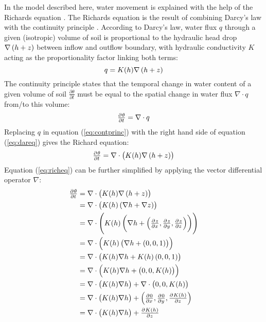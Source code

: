 In the model described here, water movement is explained with the help of the Richards equation \parencite{richards_capillary_1931}.  The Richards equation is the result of combining Darcy’s law with the continuity principle \parencite{hillel_environmental_1998}.  According to Darcy’s law, water flux $q$ through a given (isotropic) volume of soil is proportional to the hydraulic head drop $\nabla \del{ h + z }$ between inflow and outflow boundary, with hydraulic conductivity $K$ acting as the proportionality factor linking both terms:
\begin{equation}
  \label{eq:dareq}
  q = K(h) \nabla \del{ h + z }
\end{equation}
The continuity principle states that the temporal change in water content of a given volume of soil $\frac{\partial \theta}{\partial t}$ must be equal to the spatial change in water flux $\nabla \cdot q$ from/to this volume:
\begin{equation}
  \label{eq:contprinc}
  \pd{\theta}{t}  = \nabla \cdot q
\end{equation}
Replacing $q$ in equation (\ref{eq:contprinc}) with the right hand side of equation (\ref{eq:dareq}) gives the Richard equation:
\begin{equation}
  \label{eq:richeq}
  \pd{\theta}{t} = \nabla \cdot \del{ K(h) \nabla \del{ h + z } }
\end{equation}
Equation (\ref{eq:richeq}) can be further simplified by applying the vector differential operator $\nabla$: %
\begin{align*}
  \pd{\theta}{t} &= \nabla \cdot \del{ K(h) \nabla \del{ h + z } } \\
                                     &= \nabla \cdot\del{ K(h) \del{ \nabla h + \nabla z } } \\
                                     &= \nabla \cdot\del{ K(h) \del{ \nabla h + \del{ \pd{z}{x},\pd{z}{y},\pd{z}{z} } } } \\
                                     &= \nabla \cdot\del{ K(h) \del{ \nabla h + \del{ 0,0,1 } } } \\
                                     &= \nabla \cdot \del{ K(h) \nabla h + K(h) \del{ 0,0,1 } } \\
                                     &= \nabla \cdot \del{ K(h) \nabla h + \del{ 0,0,K(h) } } \\
                                     &= \nabla \cdot \del{ K(h) \nabla h } + \nabla \cdot \del{ 0,0,K(h) } \\
                                     &= \nabla \cdot \del{ K(h) \nabla h } + \del{ \pd{0}{x},\pd{0}{y},\pd{K(h)}{z}} \\
                                     &= \nabla \cdot \del{ K(h) \nabla h } + \pd{K(h)}{z}
\end{align*}
